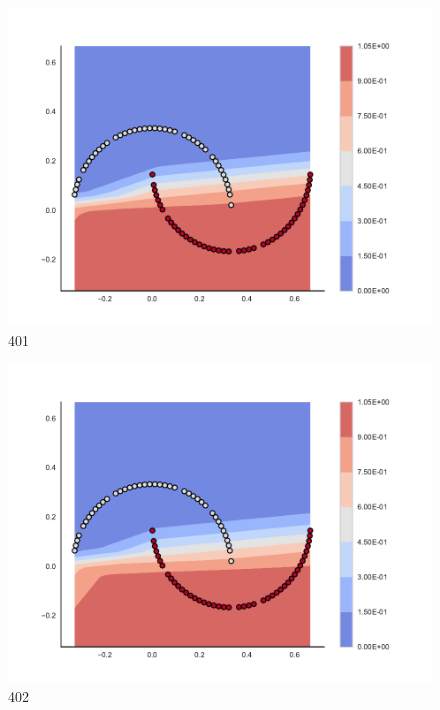 \begin{subfigure}[b]{0.09\textwidth}
    \includegraphics[clip, trim=2.35cm 1.75cm 4.5cm 0cm,width=\textwidth]{img/convergence/401.pdf}
    \caption{401}
    \label{fig:convergence_401}
\end{subfigure}
%
\begin{subfigure}[b]{0.09\textwidth}
    \includegraphics[clip, trim=2.35cm 1.75cm 4.5cm 0cm,width=\textwidth]{img/convergence/402.pdf}
    \caption{402}
    \label{fig:convergence_402}
\end{subfigure}
%

